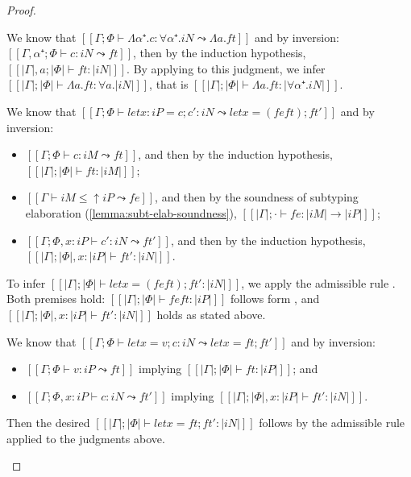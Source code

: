 \begin{proof}
\begin{caseof}
    \item {}
      We know that $[[Γ ; Φ ⊢ Λα⁺ . c : ∀α⁺.iN  ⤳  Λa.ft]]$ and by inversion:
      $[[Γ, α⁺ ; Φ ⊢ c : iN  ⤳  ft]]$, then by the induction hypothesis,
      $[[|Γ|, a ; |Φ| ⊢ ft : |iN|]]$.
      By applying  to this judgment, we infer
      $[[|Γ| ; |Φ| ⊢ Λa.ft : ∀a.|iN|]]$, that is 
      $[[|Γ| ; |Φ| ⊢ Λa.ft : |∀α⁺.iN|]]$.

    \item {}
      We know that $[[Γ; Φ ⊢ let x : iP = c; c' : iN  ⤳  let x = (fe ft) ; ft']]$ 
      and by inversion:
      \begin{itemize}
        \item $[[Γ; Φ ⊢ c : iM ⤳ ft]]$, and then by the induction hypothesis,
          $[[|Γ| ; |Φ| ⊢ ft : |iM|]]$;
        \item $[[Γ ⊢ iM ≤ ↑iP ⤳ fe]]$, and then by the soundness of 
          subtyping elaboration (\cref{lemma:subt-elab-soundness}),
          $[[|Γ| ; · ⊢ fe : |iM| → |iP|]]$;
        \item $[[Γ; Φ, x:iP ⊢ c' : iN ⤳ ft']]$, and then by the induction hypothesis,
          $[[|Γ| ; |Φ|, x:|iP| ⊢ ft' : |iN|]]$.
      \end{itemize}
      To infer $[[|Γ| ; |Φ| ⊢ let x = (fe ft) ; ft' : |iN|]]$,
      we apply the admissible \systemf rule .
      Both premises hold: $[[|Γ| ; |Φ| ⊢ fe ft : |iP|]]$ follows form ,
      and $[[|Γ| ; |Φ|, x:|iP| ⊢ ft' : |iN|]]$ holds as stated above.

    \item {}
      We know that 
      $[[Γ; Φ ⊢ let x = v; c : iN  ⤳  let x = ft ; ft']]$
      and by inversion:
      \begin{itemize}
        \item $[[Γ; Φ ⊢ v : iP ⤳ ft]]$ implying $[[|Γ| ; |Φ| ⊢ ft : |iP|]]$; and
        \item $[[Γ; Φ, x:iP ⊢ c : iN ⤳ ft']]$ implying $[[|Γ| ; |Φ|, x:|iP| ⊢ ft' : |iN|]]$.
      \end{itemize}
      Then the desired $[[|Γ| ; |Φ| ⊢ let x = ft ; ft' : |iN|]]$
      follows by the admissible \systemf rule 
      applied to the judgments above.


\end{caseof}
\end{proof}
